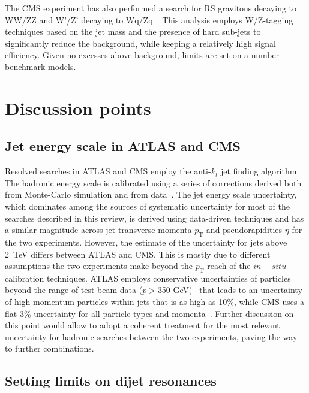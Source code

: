 \documentclass{PoS}
\newcommand{\antikt}{anti-$k_t$}
\begin{document}
The CMS experiment has also performed a search for RS gravitons decaying to 
WW/ZZ and W'/Z' decaying to Wq/Zq~\cite{Chatrchyan:2012ypy}. This analysis employs 
W/Z-tagging techniques based on the jet mass and the presence
of hard sub-jets to significantly reduce the background, while keeping a relatively high signal efficiency. 
Given no excesses above background, limits are set on a number benchmark models. 

\section{Discussion points}

\subsection{Jet energy scale in ATLAS and CMS}

Resolved searches in ATLAS and CMS employ the \antikt{} jet finding algorithm~\cite{Cacciari:2008gp}.
The hadronic energy scale is calibrated using a series of corrections 
derived both from Monte-Carlo simulation and from 
data~\cite{ATLAS-CONF-2013-004, 1748-0221-6-11-P11002, Aad:2011he}. 
The jet energy scale uncertainty, which dominates among the sources of systematic 
uncertainty for most of the searches described in this review, is derived using data-driven 
techniques and has a similar magnitude across
jet transverse momenta $p_\mathrm{T}$ and pseudorapidities $\eta$ for the two experiments. 
However, 
the estimate of the uncertainty for jets above 2~TeV differs between ATLAS and CMS. 
This is mostly due to different assumptions the two experiments make beyond the
$p_\mathrm{T}$ reach of the $in-situ$ calibration techniques. ATLAS employs conservative
uncertainties of particles beyond the range of test beam data ($p>$350 GeV)~\cite{Aad:2012vm} 
that leads to an uncertainty of high-momentum particles within jets that is as high as 10\%, 
while CMS uses a flat 3\% uncertainty for all particle types and momenta~\cite{CMS-PAS-JME-10-008}. 
Further discussion on this point would allow to adopt a coherent treatment for 
the most relevant uncertainty for hadronic searches between the two experiments,
paving the way to further combinations. 

\subsection{Setting limits on dijet resonances}
\end{document}
